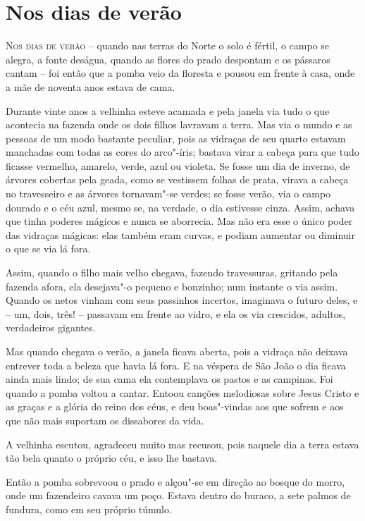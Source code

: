 \chapter{Nos dias de verão}


\textsc{Nos dias de verão} -- quando nas terras do Norte o solo é fértil, o campo
se alegra, a fonte deságua, quando as flores do prado despontam e os
pássaros cantam -- foi então que a pomba veio da floresta e pousou em
frente à casa, onde a mãe de noventa anos estava de cama.

Durante vinte anos a velhinha esteve acamada e pela janela via tudo o
que acontecia na fazenda onde os dois filhos lavravam a terra. Mas via
o mundo e as pessoas de um modo bastante peculiar, pois as vidraças de
seu quarto estavam manchadas com todas as cores do arco"-íris; bastava
virar a cabeça para que tudo ficasse vermelho, amarelo, verde, azul ou
violeta. Se fosse um dia de inverno, de árvores cobertas pela geada,
como se vestissem folhas de prata, virava a cabeça no travesseiro e as
árvores tornavam"-se verdes; se fosse verão, via o campo dourado e o
céu azul, mesmo se, na verdade, o dia estivesse cinza. Assim, achava
que tinha poderes mágicos e nunca se aborrecia. Mas não era esse o
único poder das vidraças mágicas: elas também eram curvas, e podiam
aumentar ou diminuir o que se via lá fora.

Assim, quando o filho mais velho chegava, fazendo travessuras, gritando
pela fazenda afora, ela desejava"-o pequeno e bonzinho; num instante o
via assim. Quando os netos vinham com seus passinhos incertos,
imaginava o futuro deles, e -- um, dois, três! -- passavam em frente ao
vidro, e ela os via crescidos, adultos, verdadeiros gigantes.

Mas quando chegava o verão, a janela ficava aberta, pois a vidraça não
deixava entrever toda a beleza que havia lá fora. 
E na véspera de São João o dia ficava ainda mais lindo;
de sua cama ela contemplava os pastos e as campinas. Foi quando a pomba
voltou a cantar. Entoou canções melodiosas sobre Jesus Cristo e as
graças e a glória do reino dos céus, e deu boas"-vindas aos que sofrem
e aos que não mais suportam os dissabores da vida. 

A velhinha escutou, agradeceu muito mas recusou, pois naquele dia a
terra estava tão bela quanto o próprio céu, e isso lhe bastava.

Então a pomba sobrevoou o prado e alçou"-se em direção ao bosque do
morro, onde um fazendeiro cavava um poço. Estava dentro do buraco, a
sete palmos de fundura, como em seu próprio túmulo.

